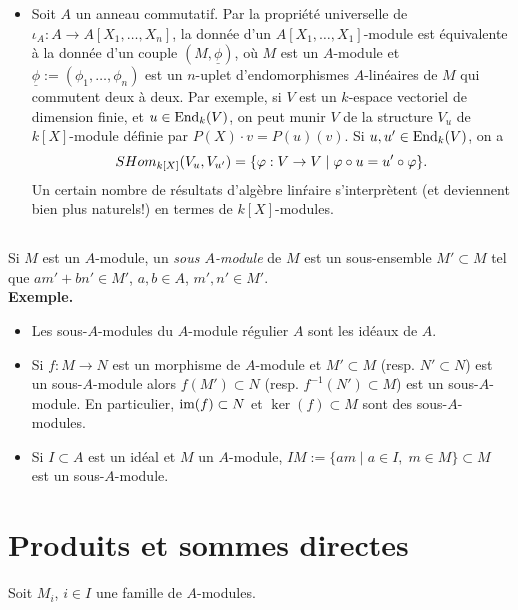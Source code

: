 \documentclass[a4paper, oneside, 12pt]{book}
\theoremstyle{theoremeStyle} %
\theoremstyle{definition} %
\DeclareMathOperator{\SHom}{Hom}
\begin{document}
\begin{itemize}[leftmargin=* ,parsep=0cm,itemsep=0cm,topsep=0cm]
\item Soit $A$ un anneau commutatif. Par la propriété universelle de $\iota_A:A\rightarrow A[X_1,\dots, X_n]$, la donnée d'un $A[X_1,\dots,X_1]$-module est équivalente à la donnée d'un couple $(M,\underline{\phi})$, où $M$ est un $A$-module et $\underline{\phi}:=(\phi_{1},\dots,\phi_{n})$ est un $n$-uplet d'endomorphismes $A$-linéaires de $M$ qui commutent deux à deux. Par exemple, si $V$ est un $k$-espace vectoriel de dimension finie, et $u\in \hbox{\rm End}_k(V)$, on peut munir $V$ de la structure $V_u$ de $k[X]$-module définie par $P(X)\cdot v=P(u)(v)$. Si $u,u'\in\hbox{\rm End}_k(V) $, on a
$$\\SHom_{k[X]}(V_u,V_{u'})=\lbrace \varphi:V\rightarrow V\; |\; \varphi\circ u=u'\circ \varphi\rbrace.$$
Un certain nombre de résultats d'algèbre lin\'raire s'interprètent (et deviennent bien plus naturels!) en termes de $k[X]$-modules.\\
\end{itemize}

 \subsection{}Si $M$ est un $A$-module, un \textit{sous $A$-module} de $M$ est un sous-ensemble $M'\subset M$ tel que $am'+bn'\in M'$, $a,b\in A $, $m',n'\in M'$. \\

 \textbf{Exemple.}
 \begin{itemize}[leftmargin=* ,parsep=0cm,itemsep=0cm,topsep=0cm]
 \item Les sous-$A$-modules du $A$-module régulier $A$ sont les idéaux de $A$.\\
\item Si $f:M\rightarrow N$ est un morphisme de $A$-module et $M'\subset M$ (resp. $N'\subset N$) est un sous-$A$-module alors $f(M')\subset N$ (resp. $f^{-1}(N')\subset M$) est un sous-$A$-module. En particulier, $\hbox{\rm im}(f)\subset N$ et $\ker(f)\subset M$ sont des sous-$A$-modules.\\
\item Si $I\subset A$ est un idéal et $M$ un $A$-module, $IM:=\lbrace am\; |\; a\in I,\; m\in M\rbrace\subset M$ est un sous-$A$-module.

\end{itemize}



\section{Produits et sommes directes}
 Soit $M_{i}$, $i\in I$ une famille de $A$-modules.\\
\end{document}
